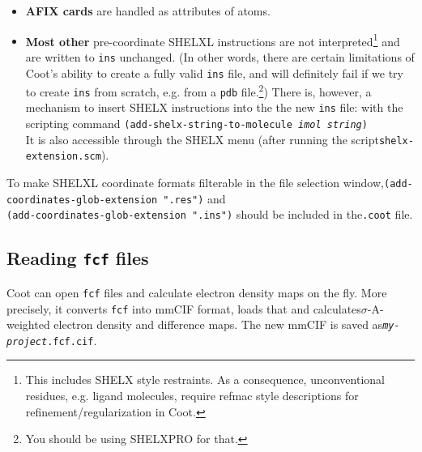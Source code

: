 \documentclass{article}
\begin{document}
\begin{itemize}
\item {\bf AFIX cards} are handled as attributes of atoms.

\item {\bf Most other} pre-coordinate SHELXL instructions are not interpreted\footnote{This includes SHELX style restraints. As a consequence, unconventional residues, e.g. ligand molecules, require refmac style descriptions for refinement/regularization in Coot.} and are written to \texttt{ins} unchanged. (In other words, there are certain limitations of Coot's ability to create a fully valid \texttt{ins} file, and will definitely fail if we try to create \texttt{ins} from scratch, e.g. from a \texttt{pdb} file.\footnote{You should be using SHELXPRO for that.}) There is, however, a mechanism to insert SHELX instructions into the the new \texttt{ins} file: with the scripting command \texttt{(add-shelx-string-to-molecule \emph{imol string})}\\It is also accessible through the SHELX menu (after running the script\linebreak[4]\texttt{shelx-extension.scm}).
\end{itemize}

To make SHELXL coordinate formats filterable in the file selection window,\linebreak[4]\texttt{(add-coordinates-glob-extension ".res")} and \\\texttt{(add-coordinates-glob-extension ".ins")} should be included in the\linebreak[4]\texttt{.coot} file.

\subsection{Reading \texttt{fcf} files}
Coot can open \texttt{fcf} files and calculate electron density maps on the fly. More precisely, it converts \texttt{fcf} into mmCIF format, loads that and calculates\linebreak[4]$\sigma$-A-weighted electron density and difference maps. The new mmCIF is saved as\linebreak[4]\texttt{\emph{my-project}.fcf.cif}.
\end{document}
